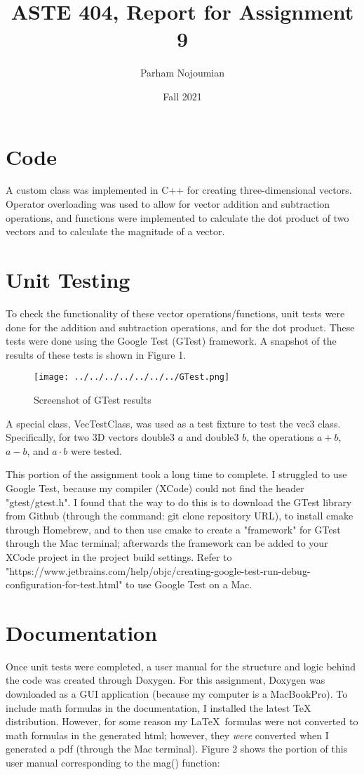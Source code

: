 \documentclass[11pt]{article}
\title{ASTE 404, Report for Assignment 9}
\author{Parham Nojoumian}
\date{Fall 2021}
\begin{document}
\maketitle

\section{Code}
A custom class was implemented in C++ for creating three-dimensional vectors. Operator overloading was used to allow for vector addition and subtraction operations, and functions were implemented to calculate the dot product of two vectors and to calculate the magnitude of a vector. 

\section{Unit Testing}
To check the functionality of these vector operations/functions, unit tests were done for the addition and subtraction operations, and for the dot product. These tests were done using the Google Test (GTest) framework. A snapshot of the results of these tests is shown in Figure 1.

\begin{figure}[h]
\centering
\texttt{[image: ../../../../../../../GTest.png]}
\caption{Screenshot of GTest results}
\end{figure}

A special class, VecTestClass, was used as a test fixture to test the vec3 class. Specifically, for two 3D vectors double3 $a$ and double3 $b$, the operations $a + b$, $a - b$, and $a \cdot b $ were tested.


This portion of the assignment took a long time to complete. I struggled to use Google Test, because my compiler (XCode) could not find the header "gtest/gtest.h". I found that the way to do this is to download the GTest library from Github (through the command: git clone repository URL), to install cmake through Homebrew, and to then use cmake to create a "framework" for GTest through the Mac terminal; afterwards the framework can be added to your XCode project in the project build settings. 
Refer to "https://www.jetbrains.com/help/objc/creating-google-test-run-debug-configuration-for-test.html" to use Google Test on a Mac.

\section{Documentation}
Once unit tests were completed, a user manual for the structure and logic behind the code was created through Doxygen. 
For this assignment, Doxygen was downloaded as a GUI application (because my computer is a MacBookPro). To include math formulas in the documentation, I installed the latest TeX distribution. However, for some reason my \LaTeX\  formulas were not converted to math formulas in the generated html; however, they \emph{were} converted when I generated a pdf (through the Mac terminal). Figure 2 shows the portion of this user manual corresponding to the mag() function:
\end{document}
